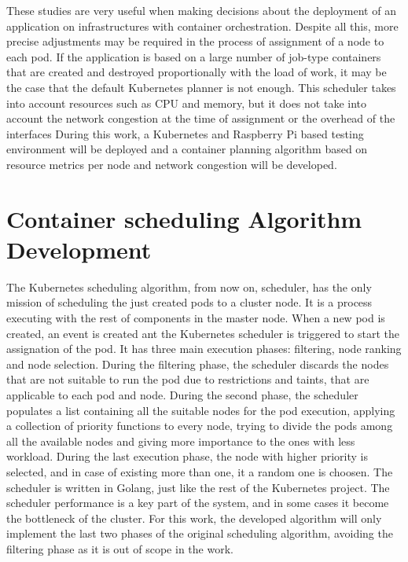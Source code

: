 \documentclass[conference]{IEEEtran}
\begin{document}
These studies are very useful when making decisions about the deployment of an application on infrastructures with container orchestration.
Despite all this, more precise adjustments may be required in the process of assignment of a node to each pod. If the application is based on a large number of
job-type containers that are created and destroyed proportionally with the load of work, it may be the case that the default Kubernetes planner is not
enough. This scheduler takes into account resources such as CPU and memory, but it does not take into account the network congestion at the time of assignment 
or the overhead of the interfaces During this work, a Kubernetes and Raspberry Pi based testing environment will be deployed and a container planning algorithm
based on resource metrics per node and network congestion will be developed.



\section{Container scheduling Algorithm Development}\label{sec:alg}



The Kubernetes scheduling algorithm, from now on, scheduler, has the only mission of scheduling
the just created pods to a cluster node. It is a process executing with the rest of components
in the master node. When a new pod is created, an event is created ant the Kubernetes scheduler is 
triggered to start the assignation of the pod. It has three main execution phases: filtering,
node ranking and node selection. During the filtering phase, the scheduler discards the nodes
that are not suitable to run the pod due to restrictions and taints, that are applicable to each pod and node.
During the second phase, the scheduler populates a list containing all the suitable nodes for the pod execution, applying
a collection of priority functions to every node, trying to divide the pods among all the
available nodes and giving more importance to the ones with less workload. During the last execution
phase, the node with higher priority is selected, and in case of existing more than one, it a random 
one is choosen. 
The scheduler is written in Golang, just like the rest of the Kubernetes project. The scheduler
performance is a key part of the system, and in some cases it become the bottleneck of the cluster.
For this work, the developed algorithm will only implement the last two phases of the original
scheduling algorithm, avoiding the filtering phase as it is out of scope in the work.
\end{document}
